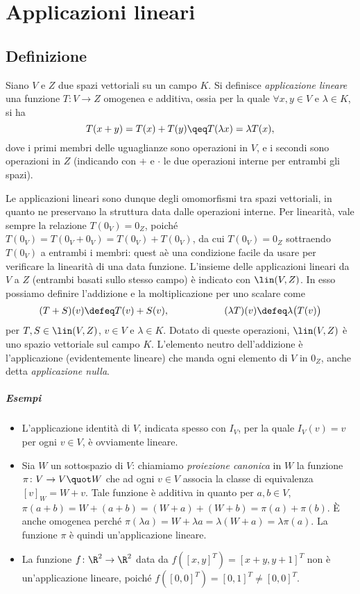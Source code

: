 \chapter{Applicazioni lineari}
\section{Definizione}
\begin{definizione} \label{d:applicazione-lineare}
	Siano $V$ e $Z$ due spazi vettoriali su un campo $K$.
	Si definisce \emph{applicazione lineare} una funzione $T\colon V\to Z$ omogenea e additiva, ossia per la quale $\forall  x,  y\in V$ e $\lambda\in K$, si ha
	\begin{equation*}
		T(x+y)=T(x)+T(y)\qeq T(\lambda x)=\lambda T(x),
	\end{equation*}
	dove i primi membri delle uguaglianze sono operazioni in $V$, e i secondi sono operazioni in $Z$ (indicando con $+$ e $\cdot$ le due operazioni interne per entrambi gli spazi).
\end{definizione}
Le applicazioni lineari sono dunque degli omomorfismi tra spazi vettoriali, in quanto ne preservano la struttura data dalle operazioni interne.
Per linearità, vale sempre la relazione $T(0_V)=0_Z$, poiché $T(0_V)=T(0_V+0_V)=T(0_V)+T(0_V)$, da cui $T(0_V)=0_Z$ sottraendo $T(0_V)$ a entrambi i membri: quest aè una condizione facile da usare per verificare la linearità di una data funzione.
L'insieme delle applicazioni lineari da $V$ a $Z$ (entrambi basati sullo stesso campo) è indicato con $\lin(V,Z)$.
In esso possiamo definire l'addizione e la moltiplicazione per uno scalare come
\begin{equation*}
	(T+S)(v)\defeq T(v)+S(v),\hspace{2cm}(\lambda T)(v)\defeq \lambda \big(T(v)\big)
\end{equation*}
per $T,S\in\lin(V,Z)$, $v\in V$ e $\lambda\in K$.
Dotato di queste operazioni, $\lin(V,Z)$ è uno spazio vettoriale sul campo $K$.
L'elemento neutro dell'addizione è l'applicazione (evidentemente lineare) che manda ogni elemento di $V$ in $0_Z$, anche detta \emph{applicazione nulla}.

\paragraph{Esempi}
\begin{itemize}
	\item L'applicazione identità di $V$, indicata spesso con $I_V$, per la quale $I_V(v)=v$ per ogni $v\in V$, è ovviamente lineare.
	\item Sia $W$ un sottospazio di $V$: chiamiamo \emph{proiezione canonica} in $W$ la funzione $\pi\colon V\to V\quot W$ che ad ogni $v\in V$ associa la classe di equivalenza $[v]_W=W+v$.
		Tale funzione è additiva in quanto per $a,b\in V$, $\pi(a+b)=W+(a+b)=(W+a)+(W+b)=\pi(a)+\pi(b)$.
		È anche omogenea perch\'e $\pi(\lambda a)=W+\lambda a=\lambda(W+a)=\lambda\pi(a)$.
		La funzione $\pi$ è quindi un'applicazione lineare.
	\item La funzione $f\colon\R^2\to\R^2$ data da $f([x,y]^T)=[x+y,y+1]^T$ non è un'applicazione lineare, poich\'e $f([0,0]^T)=[0,1]^T\ne[0,0]^T$.
\end{itemize}

